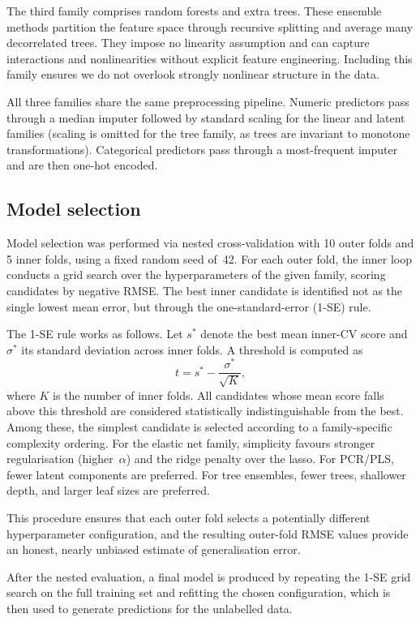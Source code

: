 \documentclass{article}
\begin{document}
The third family comprises random forests and extra trees. These ensemble methods partition the feature space through recursive splitting and average many decorrelated trees. They impose no linearity assumption and can capture interactions and nonlinearities without explicit feature engineering. Including this family ensures we do not overlook strongly nonlinear structure in the data.

All three families share the same preprocessing pipeline. Numeric predictors pass through a median imputer followed by standard scaling for the linear and latent families (scaling is omitted for the tree family, as trees are invariant to monotone transformations). Categorical predictors pass through a most-frequent imputer and are then one-hot encoded.

\subsection*{Model selection}

Model selection was performed via nested cross-validation with 10 outer folds and 5 inner folds, using a fixed random seed of~42. For each outer fold, the inner loop conducts a grid search over the hyperparameters of the given family, scoring candidates by negative RMSE. The best inner candidate is identified not as the single lowest mean error, but through the one-standard-error (1-SE) rule.

The 1-SE rule works as follows. Let $s^*$ denote the best mean inner-CV score and $\sigma^*$ its standard deviation across inner folds. A threshold is computed as
\[
  t = s^* - \frac{\sigma^*}{\sqrt{K}},
\]
where $K$ is the number of inner folds. All candidates whose mean score falls above this threshold are considered statistically indistinguishable from the best. Among these, the simplest candidate is selected according to a family-specific complexity ordering. For the elastic net family, simplicity favours stronger regularisation (higher~$\alpha$) and the ridge penalty over the lasso. For PCR/PLS, fewer latent components are preferred. For tree ensembles, fewer trees, shallower depth, and larger leaf sizes are preferred.

This procedure ensures that each outer fold selects a potentially different hyperparameter configuration, and the resulting outer-fold RMSE values provide an honest, nearly unbiased estimate of generalisation error.

After the nested evaluation, a final model is produced by repeating the 1-SE grid search on the full training set and refitting the chosen configuration, which is then used to generate predictions for the unlabelled data.
\end{document}
